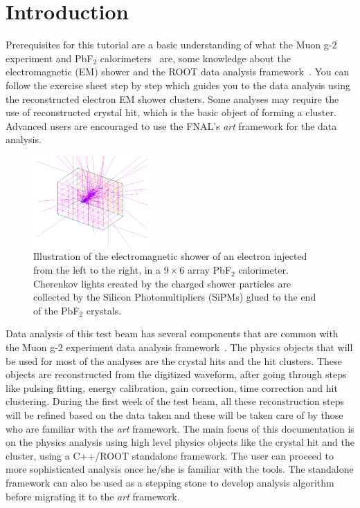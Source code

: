 \chapter{Introduction}
\label{chap:one}

Prerequisites for this tutorial are a basic understanding of what the Muon g-2 experiment and PbF$_2$ calorimeters~\cite{Fienberg2015} are, some knowledge about the electromagnetic (EM) shower and the ROOT data analysis framework~\cite{ROOT}. You can follow the exercise sheet step by step which guides you to the data analysis using the reconstructed electron EM shower clusters. Some analyses may require the use of reconstructed crystal hit, which is the basic object of forming a cluster. Advanced users are encouraged to use the FNAL's \textit{art} framework for the data analysis.
%
\begin{figure}[htbp]
\centering
\includegraphics[trim=3cm 1cm 3cm 0cm, width=0.4\textwidth]{pics/EMShower.pdf}
\caption{Illustration of the electromagnetic shower of an electron injected from the left to the right, in a $9\times6$ array PbF$_2$ calorimeter. Cherenkov lights created by the charged shower particles are collected by the Silicon Photomultipliers (SiPMs) glued to the end of the PbF$_2$ crystals.}
\end{figure}

Data analysis of this test beam has several components that are common with the Muon g-2 experiment data analysis framework~\cite{Khaw2016}. The physics objects that will be used for most of the analyses are the crystal hits and the hit clusters.
These objects are reconstructed from the digitized waveform, after going through steps like pulsing fitting, energy calibration, gain correction, time correction and hit clustering. During the first week of the test beam, all these reconstruction steps
will be refined based on the data taken and these will be taken care of by those who are familiar with the \textit{art} framework. The main focus of this documentation is on the physics analysis using high level physics objects like the crystal hit and the cluster, using a C++/ROOT standalone framework. The user can proceed to more sophisticated analysis once he/she is familiar with the tools. The standalone framework can also be used as a stepping stone to develop analysis algorithm before migrating it to the \textit{art} framework.

